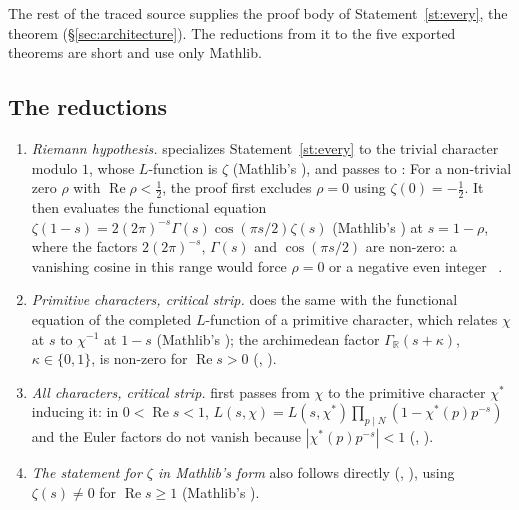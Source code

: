 The rest of the traced source supplies the proof body of Statement~\ref{st:every}, the theorem
 (\S\ref{sec:architecture}). The reductions from it
to the five exported theorems are short and use only Mathlib.

\subsection{The reductions}

\begin{enumerate}
\item \emph{Riemann hypothesis.}  specializes
  Statement~\ref{st:every} to the trivial character modulo $1$, whose $L$-function is $\zeta$
  (Mathlib's ), and passes to :
  For a non-trivial zero $\rho$ with $\operatorname{Re}\rho<\frac12$, the proof first excludes
  $\rho=0$ using $\zeta(0)=-\frac12$. It then evaluates the functional equation
  $\zeta(1-s)=2(2\pi)^{-s}\Gamma(s)\cos(\pi s/2)\zeta(s)$ (Mathlib's )
  at $s=1-\rho$, where the factors $2(2\pi)^{-s}$, $\Gamma(s)$ and $\cos(\pi s/2)$ are non-zero: a
  vanishing cosine in this range would force $\rho=0$ or a negative even integer
   \stcs~\cite{davenport}.
\item \emph{Primitive characters, critical strip.} 
   does the same with the functional
  equation of the completed $L$-function of a primitive character, which relates $\chi$ at $s$ to
  $\chi^{-1}$ at $1-s$ (Mathlib's ); the
  archimedean factor $\Gamma_{\mathbb R}(s+\kappa)$, $\kappa\in\{0,1\}$, is non-zero for
  $\operatorname{Re}s>0$ (,
  ).
\item \emph{All characters, critical strip.} 
   first passes from
  $\chi$ to the primitive character $\chi^\ast$ inducing it: in $0<\operatorname{Re}s<1$,
  $L(s,\chi)=L(s,\chi^\ast)\prod_{p\mid N}(1-\chi^\ast(p)p^{-s})$ and the Euler factors do not vanish
  because $|\chi^\ast(p)p^{-s}|<1$ (, ).
\item \emph{The statement for $\zeta$ in Mathlib's form} also follows directly (,
  ), using
  $\zeta(s)\ne0$ for $\operatorname{Re}s\ge1$ (Mathlib's ).
\end{enumerate}

